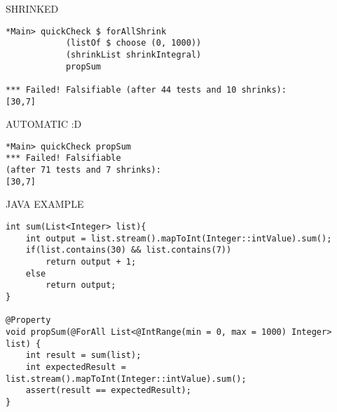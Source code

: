 SHRINKED

\begin{verbatim}
*Main> quickCheck $ forAllShrink 
            (listOf $ choose (0, 1000)) 
            (shrinkList shrinkIntegral) 
            propSum

*** Failed! Falsifiable (after 44 tests and 10 shrinks):     
[30,7]
\end{verbatim}

AUTOMATIC :D

\begin{verbatim}
*Main> quickCheck propSum
*** Failed! Falsifiable 
(after 71 tests and 7 shrinks):     
[30,7]
\end{verbatim}

JAVA EXAMPLE

\begin{verbatim}
int sum(List<Integer> list){
    int output = list.stream().mapToInt(Integer::intValue).sum();
    if(list.contains(30) && list.contains(7))
        return output + 1;
    else
        return output;
}

@Property
void propSum(@ForAll List<@IntRange(min = 0, max = 1000) Integer> list) {
    int result = sum(list);
    int expectedResult = list.stream().mapToInt(Integer::intValue).sum();
    assert(result == expectedResult);
}
\end{verbatim}
